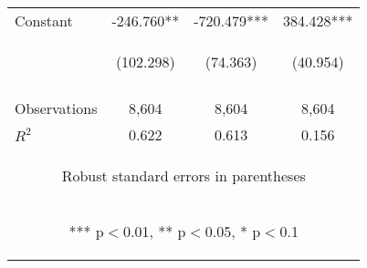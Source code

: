 \begin{center}
\begin{tabular}{lccc}
Constant & -246.760** & -720.479*** & 384.428*** \\
 & \begin{footnotesize}(102.298)\end{footnotesize} & \begin{footnotesize}(74.363)\end{footnotesize} & \begin{footnotesize}(40.954)\end{footnotesize} \\
\vspace{4pt} & \begin{footnotesize}\end{footnotesize} & \begin{footnotesize}\end{footnotesize} & \begin{footnotesize}\end{footnotesize} \\
Observations & 8,604 & 8,604 & 8,604 \\
 $R^2$ & 0.622 & 0.613 & 0.156 \\ \hline
\multicolumn{4}{c}{\begin{footnotesize} Robust standard errors in parentheses\end{footnotesize}} \\
\multicolumn{4}{c}{\begin{footnotesize} *** p$<$0.01, ** p$<$0.05, * p$<$0.1\end{footnotesize}} \\
\end{tabular}
\end{center}
